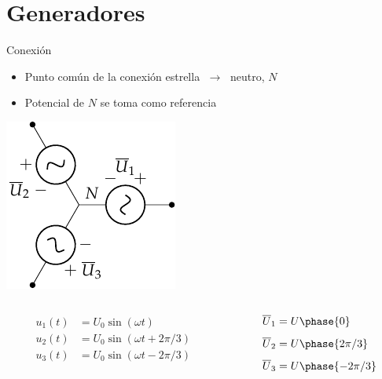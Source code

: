 \documentclass[aspectratio=169, usenames,svgnames,dvipsnames]{beamer}
\begin{document}

\section{Generadores}

\begin{frame}{Conexión}

    \begin{itemize}
        \item Punto común de la conexión estrella $\; \rightarrow \;$ \alert{neutro}, $N$
        \item Potencial de $N$ se toma como \alert{referencia}
    \end{itemize}

    \begin{center}
        \includegraphics[height=0.5\textheight]{../figs/GeneradoresTrifasica.pdf}
    \end{center}

    \vspace{-12mm}
    \begin{columns}
    \begin{column}{0.45\columnwidth}
        \begin{align*}
          u_1(t) &= U_0 \sin(\omega t)\\[4pt]
          u_2(t) &= U_0 \sin(\omega t + 2\pi/3)\\[4pt]
          u_3(t) &= U_0 \sin(\omega t - 2\pi/3)
        \end{align*}
    \end{column}
    \hfill
    \begin{column}{0.5\columnwidth}
        \begin{align*}
          \overline{U}_1 &= U\phase{0}\\[4pt]
          \overline{U}_2 &= U\phase{2\pi/3}\\[4pt]
          \overline{U}_3 &= U\phase{-2\pi/3}
        \end{align*}
    \end{column}
    \end{columns}
\end{frame}
\end{document}
